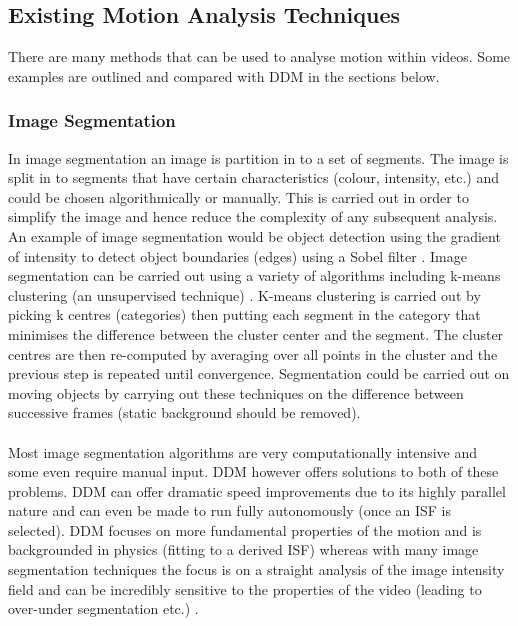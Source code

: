 \documentclass[10pt]{article}
\begin{document}
\subsection{Existing Motion Analysis Techniques}
\label{section:existing}
There are many methods that can be used to analyse motion within videos. Some examples are outlined and compared with DDM in the sections below.
\subsubsection{Image Segmentation}
In image segmentation an image is partition in to a set of segments. The image is split in to segments that have certain characteristics (colour, intensity, etc.) and could be chosen algorithmically or manually. This is carried out in order to simplify the image and hence reduce the complexity of any subsequent analysis. \cite{computer_vision_book} An example of image segmentation would be object detection using the gradient of intensity to detect object boundaries (edges) using a Sobel filter \cite{sobel}. Image segmentation can be carried out using a variety of algorithms including k-means clustering (an unsupervised technique) \cite{segmentation_kmeans}. K-means clustering is carried out by picking k centres (categories) then putting each segment in the category that minimises the difference between the cluster center and the segment. The cluster centres are then re-computed by averaging over all points in the cluster and the previous step is repeated until convergence. Segmentation could be carried out on moving objects by carrying out these techniques on the difference between successive frames (static background should be removed).
\\\\
Most image segmentation algorithms are very computationally intensive and some even require manual input. DDM however offers solutions to both of these problems. DDM can offer dramatic speed improvements due to its highly parallel nature and can even be made to run fully autonomously (once an ISF is selected). DDM focuses on more fundamental properties of the motion and is backgrounded in physics (fitting to a derived ISF) whereas with many image segmentation techniques the focus is on a straight analysis of the image intensity field and can be incredibly sensitive to the properties of the video (leading to over-under segmentation etc.) \cite{computer_vision_book}. 
\end{document}
